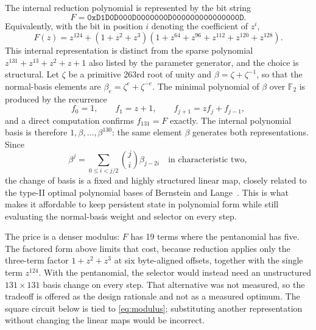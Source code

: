 \documentclass[11pt,a4paper]{article}
\newcommand{\F}{\mathbb{F}}
\begin{document}
The internal reduction polynomial is represented by the bit string
\begin{equation}\label{eq:modulus}
 F=\mathtt{0xD1D0D000D0000000D000000000000000D}.
\end{equation}
Equivalently, with the bit in position $i$ denoting the coefficient of $z^i$,
\begin{equation}
 F(z)=z^{124}+(1+z^2+z^3)(1+z^{64}+z^{96}+z^{112}+z^{120}+z^{128}).
\end{equation}
This internal representation is distinct from the sparse polynomial $z^{131}+z^{13}+z^2+z+1$ also listed by the parameter generator, and the choice is structural. Let $\zeta$ be a primitive 263rd root of unity and $\beta=\zeta+\zeta^{-1}$, so that the normal-basis elements are $\beta_e=\zeta^e+\zeta^{-e}$. The minimal polynomial of $\beta$ over $\F_2$ is produced by the recurrence
\begin{equation}\label{eq:recurrence}
 f_0=1,\qquad f_1=z+1,\qquad f_{j+1}=z f_j+f_{j-1},
\end{equation}
and a direct computation confirms $f_{131}=F$ exactly. The internal polynomial basis is therefore $1,\beta,\ldots,\beta^{130}$: the same element $\beta$ generates both representations. Since
\begin{equation}
 \beta^j=\sum_{0\leq i<j/2}\binom{j}{i}\beta_{j-2i}\quad\text{in characteristic two},
\end{equation}
the change of basis is a fixed and highly structured linear map, closely related to the type-II optimal polynomial bases of Bernstein and Lange~\cite{bernstein2010opb}. This is what makes it affordable to keep persistent state in polynomial form while still evaluating the normal-basis weight and selector on every step.

The price is a denser modulus: $F$ has 19 terms where the pentanomial has five. The factored form above limits that cost, because reduction applies only the three-term factor $1+z^2+z^3$ at six byte-aligned offsets, together with the single term $z^{124}$. With the pentanomial, the selector would instead need an unstructured $131\times131$ basis change on every step. That alternative was not measured, so the tradeoff is offered as the design rationale and not as a measured optimum. The square circuit below is tied to \cref{eq:modulus}; substituting another representation without changing the linear maps would be incorrect.
\end{document}
